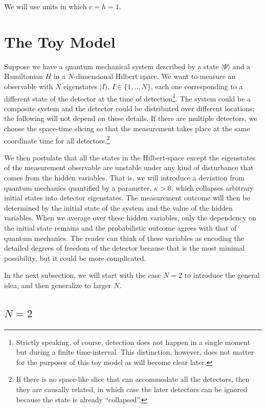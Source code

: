 \documentclass[12pt]{article}
\begin{document}
 We will use units in which $c= \hbar =1$. 


\section{The Toy Model}

 Suppose we have a quantum mechanical system described by a state $|\Psi \rangle$ and a Hamiltonian $ H$ in a $N$-dimensional Hilbert space. We want to measure an observable with $N$  eigenstates $| I \rangle$, $I \in \{1,.., N\}$, each one corresponding to a different state of the detector at the time of detection\footnote{Strictly speaking, of course, detection does not happen in a single moment but during a finite time-interval.
This distinction, however, does not matter for the purposes of this toy model as will become clear later.}.
The system could be a composite system and the detector could be distributed over different locations; the following will not depend on these details. If there are multiple detectors, we choose the space-time slicing so that the measurement takes place at the same coordinate time for all detectors.\footnote{If there is no space-like slice that can accommodate all the detectors, then they are causally related, in which case the later detectors can be ignored because the state is already ``collapsed''.}

We then postulate that all the states in the Hilbert-space except the eigenstates of the
measurement observable are unstable under any kind of disturbance that comes from the hidden variables. That is, we will introduce a deviation from quantum mechanics quantified by a parameter, $\kappa>0$, which collapses arbitrary initial states into detector eigenstates. The measurement outcome will then be determined by the initial state of the system and the value of the hidden variables. When we average over these hidden variables, only the dependency on the initial state remains and the probabilistic outcome agrees with that of quantum mechanics. The reader can think of these variables as encoding the detailed
degrees of freedom of the detector because that is the most minimal possibility, but it could be more
complicated.

In the next subsection, we will start with the case $N=2$ to introduce the general idea, and then generalize to larger $N$. 

\subsection{$N=2$}
\end{document}
